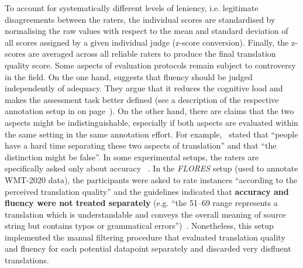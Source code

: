 To account for systematically different levels of leniency, i.e. legitimate disagreements between the raters, the individual scores are standardised by normalising the raw values with respect to the mean and standard deviation of all scores assigned by a given individual judge (z-score conversion). Finally, the z-scores are averaged across all reliable raters to produce the final translation quality score.   
\label{pg:controvercy_over_acc_and_flu}
Some aspects of evaluation protocols remain subject to controversy in the field. On the one hand, \citet{Graham2013, Graham2015} suggests that fluency should be judged independently of adequacy. 
They argue that it reduces the cognitive load and makes the assessment task better defined (see a description of the respective annotation setup in \citet{Daems2013} on page~\pageref{pg:daems_two-stage_errorann}). %
On the other hand, there are claims that the two aspects might be indistinguishable, especially if both aspects are evaluated within the same setting in the same annotation effort. For example,~\citet[p.140]{CallisonBurch2007} stated that ``people have a hard time separating these two aspects of translation'' and that ``the distinction might be false''.
In some experimental setups, the raters are specifically asked only about accuracy ~\cite[``How accurately does the above candidate text convey the semantics of the source text?'' in][]{Hassan2018}. 
In the \textit{FLORES} setup (used to annotate WMT-2020 data), the participants were asked to rate instances ``according to the perceived translation quality'' and the guidelines indicated that \textbf{accuracy and fluency were not treated separately} (e.g. ``the 51--69 range represents a translation which is understandable and conveys the overall meaning of source string but contains typos or grammatical errors'')~\cite[p.6109]{Guzman2019}. Nonetheless, this setup implemented the manual filtering procedure that evaluated translation quality and fluency for each potential datapoint separately and discarded very disfluent translations. 
